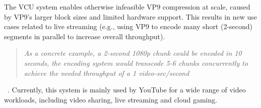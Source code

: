 The \ac{VCU} system enables otherwise infeasible VP9 compression at scale, caused by VP9's larger block sizes and limited hardware support. This results in new use cases related to live streaming (e.g., using VP9 to encode many short (2-second) segments in parallel to increase overall throughput). \blockquote{\textit{As a concrete example, a 2-second 1080p chunk could be encoded in 10 seconds, the encoding system would transcode 5-6 chunks concurrently to achieve the needed throughput of a 1 video-sec/second}}~\parencite{youtube_vpu}.
Currently, this system is mainly used by YouTube for a wide range of video workloads, including video sharing, live streaming and cloud gaming. 